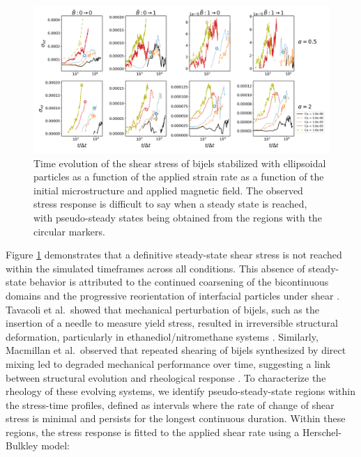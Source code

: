 \begin{figure} 
    \centering 
    \includegraphics[scale=0.3]{../figures/results/paper3/stress-time_compare.png} 
    \caption{Time evolution of the shear stress of bijels stabilized with ellipsoidal particles as a function of the applied strain rate as
             a function of the initial microstructure and applied magnetic field. The observed stress response is difficult to say when a steady
             state is reached, with pseudo-steady states being obtained from the regions with the circular markers.} 
    \label{fig:stress_time} 
\end{figure}

Figure \ref{fig:stress_time} demonstrates that a definitive steady-state shear stress is not reached within the simulated timeframes across all conditions. 
This absence of steady-state behavior is attributed to the continued coarsening of the bicontinuous domains and the progressive reorientation of interfacial 
particles under shear \cite{tavacoli_novel_2011, macmillan_rheological_2019}. Tavacoli et al.\ showed that mechanical perturbation of bijels, such as the 
insertion of a needle to measure yield stress, resulted in irreversible structural deformation, particularly in ethanediol/nitromethane systems 
\cite{tavacoli_novel_2011}. Similarly, Macmillan et al.\ observed that repeated shearing of bijels synthesized by direct mixing led to degraded mechanical 
performance over time, suggesting a link between structural evolution and rheological response \cite{macmillan_rheological_2019}. To characterize the rheology 
of these evolving systems, we identify pseudo-steady-state regions within the stress-time profiles, defined as intervals where the rate of change of shear 
stress is minimal and persists for the longest continuous duration. Within these regions, the stress response is fitted to the applied shear rate using a 
Herschel-Bulkley model:  

